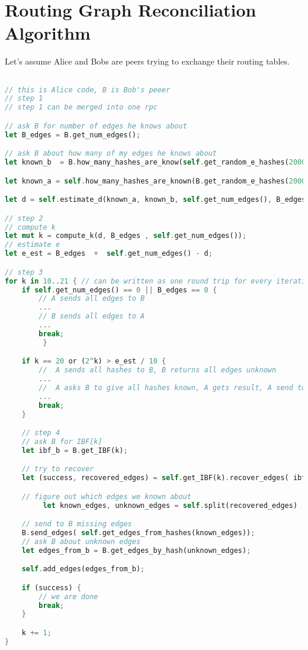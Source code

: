 \documentclass[11pt]{article}
\begin{document}
\section{Routing Graph Reconciliation Algorithm}
Let's assume Alice and Bobs are peers trying to exchange their routing tables.
\begin{lstlisting}[language=Rust]

// this is Alice code, B is Bob's peeer
// step 1
// step 1 can be merged into one rpc

// ask B for number of edges he knows about
let B_edges = B.get_num_edges();

// ask B about how many of my edges he knows about
let known_b  = B.how_many_hashes_are_know(self.get_random_e_hashes(2000));

let known_a = self.how_many_hashes_are_known(B.get_random_e_hashes(2000));

let d = self.estimate_d(known_a, known_b, self.get_num_edges(), B_edges);

// step 2
// compute k
let mut k = compute_k(d, B_edges , self.get_num_edges());
// estimate e
let e_est = B_edges  +  self.get_num_edges() - d;

// step 3
for k in 10..21 { // can be written as one round trip for every iteration
	if self.get_num_edges() == 0 || B_edges == 0 {
		// A sends all edges to B
		...
		// B sends all edges to A
		...
		break;
         }

	if k == 20 or (2^k) > e_est / 10 {
		//  A sends all hashes to B, B returns all edges unknown
		...
		//  A asks B to give all hashes known, A gets result, A send to B all edges it needs
		...
		break;
	}

	// step 4
	// ask B for IBF[k]
	let ibf_b = B.get_IBF(k);

	// try to recover
	let (success, recovered_edges) = self.get_IBF(k).recover_edges( ibf_b);

	// figure out which edges we known about
         let known_edges, unknown_edges = self.split(recovered_edges)

	// send to B missing edges
	B.send_edges( self.get_edges_from_hashes(known_edges));
	// ask B about unknown edges
	let edges_from_b = B.get_edges_by_hash(unknown_edges);

	self.add_edges(edges_from_b);

	if (success) {
		// we are done
		break;
	}

	k += 1;
}
\end{lstlisting}
\end{document}
